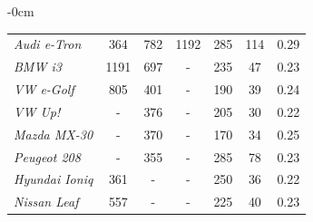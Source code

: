 \begin{table}[H]
\begin{adjustwidth}{-\extralength}{0cm}
{\begin{tabular}{@{}lcccccc@{}}
\textit{Audi e-Tron}             & 364        & 782        & 1192       & 285                     & 114                                                                                                   & 0.29                                                                                            \\
\textit{BMW i3}                  & 1191       & 697        & -          & 235                     & 47                                                                                                    & 0.23                                                                                            \\
\textit{VW e-Golf}               & 805        & 401        & -          & 190                     & 39                                                                                                    & 0.24                                                                                            \\
\textit{VW Up!}                  & -          & 376        & -          & 205                     & 30                                                                                                    & 0.22                                                                                            \\
\textit{Mazda MX-30}             & -          & 370        & -          & 170                     & 34                                                                                                    & 0.25                                                                                            \\
\textit{Peugeot 208}             & -          & 355        & -          & 285                     & 78                                                                                                    & 0.23                                                                                            \\
\textit{Hyundai Ioniq}           & 361        & -          & -          & 250                     & 36                                                                                                    & 0.22                                                                                            \\
\textit{Nissan Leaf}             & 557        & -          & -          & 225                     & 40                                                                                                    & 0.23                                                                                            \\

\end{tabular}}
\end{adjustwidth}
\end{table}
